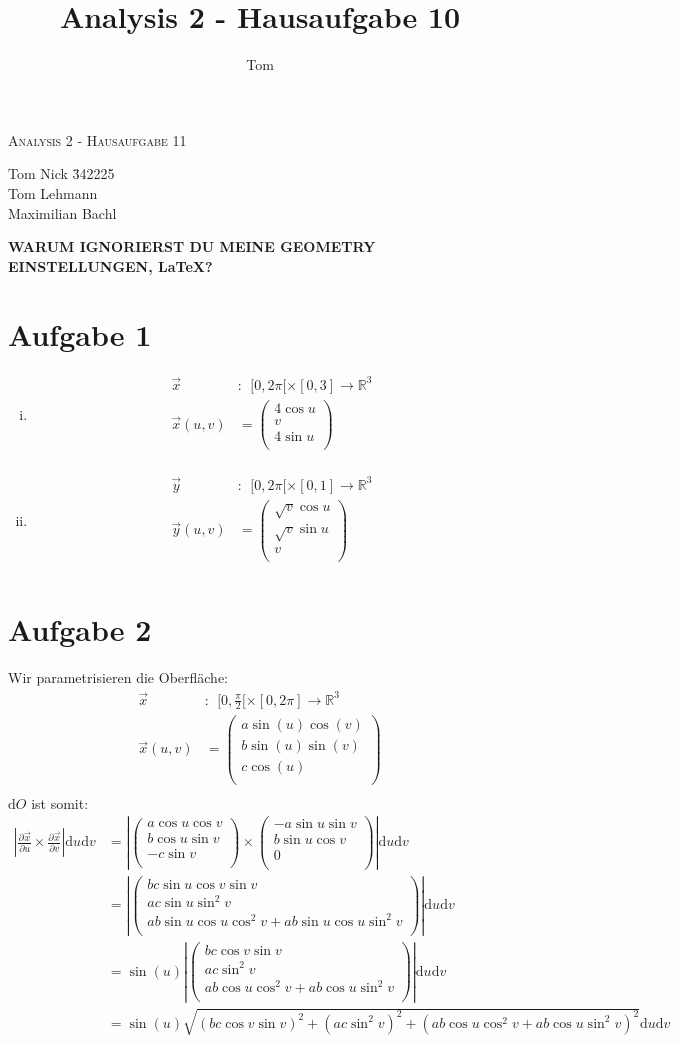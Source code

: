 \documentclass[10pt,a4paper,parskip=half]{scrartcl}
\author{Tom}
\title{Analysis 2 - Hausaufgabe 10}
\newcommand{\vecthree}[3]{\begin{pmatrix}#1\\#2\\#3\\\end {pmatrix}}
\begin{document}
\begin{center}
\textsc{\Large{Analysis 2 - Hausaufgabe 11}} \\
\end{center}
\begin{tabbing}
Tom Nick \hspace{1.4cm}\= 342225\\
Tom Lehmann\\
Maximilian Bachl
\end{tabbing}
\textbf{WARUM IGNORIERST DU MEINE GEOMETRY EINSTELLUNGEN, \LaTeX?}
\section*{Aufgabe 1}
\begin{enumerate}[(i)]
\item
\begin{align*}
\vec x&:~~ [0,2\pi[ \times [0,3] \to \mathbb{R}^3\\
\vec x(u,v) &= \vecthree{4\cos u}{v}{4\sin u} \\
\end{align*}
\item
\begin{align*}
\vec y&:~~ [0,2\pi[ \times [0,1] \to \mathbb{R}^3\\
\vec y(u,v) &= \vecthree{\sqrt v\cos u}{\sqrt v\sin u}{v} \\
\end{align*}
\end{enumerate}
\section*{Aufgabe 2}
Wir parametrisieren die Oberfläche:
\begin{align*}
\vec x&:~~ [0,\frac {\pi}2[ \times [0,2\pi] \to \mathbb{R}^3\\
\vec x(u,v) &= \vecthree{a\sin(u) \cos(v)}{b\sin(u)\sin(v)}{c \cos(u)} \\
\end{align*}
$\mathrm d  O$ ist somit:
\begin{align*}
\left|\frac{\partial \vec x}{\partial u} \times \frac{\partial \vec x}{\partial v}\right| \mathrm d u \mathrm d v &= \left|\vecthree{a \cos u \cos v}{b \cos u \sin v}{-c \sin v} \times \vecthree{-a \sin u \sin v}{b \sin u \cos v}{0}\right| \mathrm d u \mathrm d v\\
&= \left|\vecthree{bc \sin u \cos v \sin v}{ac \sin u \sin^2 v}{ab \sin u \cos u \cos^2 v + ab \sin u \cos u \sin^2 v}\right| \mathrm d u \mathrm d v\\
&= \sin(u) \left| \vecthree{bc \cos v \sin v}{ac \sin^2 v}{ab \cos u \cos^2 v + ab \cos u \sin^2 v}\right| \mathrm d u \mathrm d v\\
&= \sin(u) \sqrt{\left(bc \cos v \sin v\right)^2 + \left(ac \sin^2 v\right)^2 + \left(ab \cos u \cos^2 v + ab \cos u \sin^2 v\right)^2} \mathrm d u \mathrm d v
\end{align*}
\end{document}
